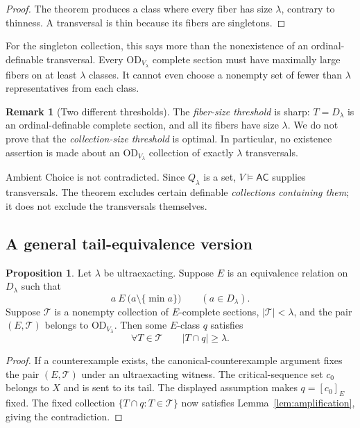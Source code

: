 \documentclass[11pt,letterpaper]{article}
\theoremstyle{definition}
\newtheorem{proposition}[definition]{Proposition}
\newtheorem{remark}[definition]{Remark}
\numberwithin{equation}{section}
\newcommand{\AC}{\mathsf{AC}}
\newcommand{\OD}{\mathrm{OD}}
\newcommand{\Tcal}{\mathcal T}
\begin{document}
\begin{proof}
The theorem produces a class where every fiber has size $\lambda$, contrary to thinness. A transversal is thin because its fibers are singletons.
\end{proof}

For the singleton collection, this says more than the nonexistence of an ordinal-definable transversal. Every $\OD_{V_\lambda}$ complete section must have maximally large fibers on at least $\lambda$ classes. It cannot even choose a nonempty set of fewer than $\lambda$ representatives from each class.

\begin{remark}[Two different thresholds]
The \emph{fiber-size threshold} is sharp: $T=D_\lambda$ is an ordinal-definable complete section, and all its fibers have size $\lambda$. We do not prove that the \emph{collection-size threshold} is optimal. In particular, no existence assertion is made about an $\OD_{V_\lambda}$ collection of exactly $\lambda$ transversals.
\end{remark}

Ambient Choice is not contradicted. Since $Q_\lambda$ is a set, $V\models\AC$ supplies transversals. The theorem excludes certain definable \emph{collections containing them}; it does not exclude the transversals themselves.

\subsection{A general tail-equivalence version}

\begin{proposition}\label{prop:tail-general}
Let $\lambda$ be ultraexacting. Suppose $E$ is an equivalence relation on $D_\lambda$ such that
\[
a\ E\ \bigl(a\setminus\{\min a\}\bigr)\qquad(a\in D_\lambda).
\]
Suppose $\Tcal$ is a nonempty collection of $E$-complete sections, $|\Tcal|<\lambda$, and the pair $(E,\Tcal)$ belongs to $\OD_{V_\lambda}$. Then some $E$-class $q$ satisfies
\[
\forall T\in\Tcal\qquad |T\cap q|\ge\lambda.
\]
\end{proposition}

\begin{proof}
If a counterexample exists, the canonical-counterexample argument fixes the pair $(E,\Tcal)$ under an ultraexacting witness. The critical-sequence set $c_0$ belongs to $X$ and is sent to its tail. The displayed assumption makes $q=[c_0]_E$ fixed. The fixed collection $\{T\cap q:T\in\Tcal\}$ now satisfies Lemma~\ref{lem:amplification}, giving the contradiction.
\end{proof}
\end{document}
